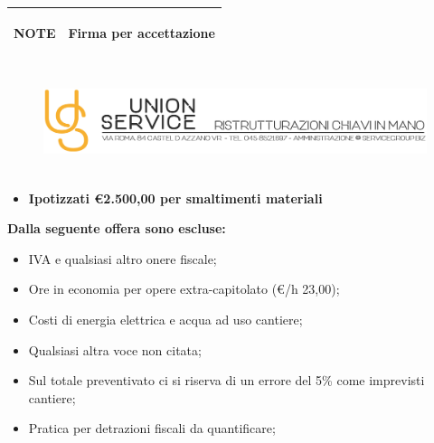 \documentclass[a4paper]{article}
\begin{document}
                       
                      \vspace{19mm}


                      \begin{center}
                      \begin{tabular}{|L{105mm} | L{44mm}| }
                      \hline
                      \begin{spacing}{0.3}
                        \textbf{NOTE} \newline
                        \hfill
                      
                      \end{spacing}&
                      \begin{spacing}{0.3}
                      \textbf{Firma per accettazione}
                      \end{spacing}\\
                      \hline
                      \end{tabular}
                      \end{center}

                      \newpage

                      \begin{figure}[!t]
                      \includegraphics[width=15.8cm, height=3cm]{intestazioneAlta2.jpg}
                      \end{figure}

                      \begin{itemize}
                          \item \textbf{Ipotizzati \euro 2.500,00 per smaltimenti materiali}
                      \end{itemize}

                      \noindent\textbf{Dalla seguente offera sono escluse:}
                      \begin{itemize}
                          \item IVA e qualsiasi altro onere fiscale;
                          \item Ore in economia per opere extra-capitolato (\euro/h 23,00);
                          \item Costi di energia elettrica e acqua ad uso cantiere;
                          \item Qualsiasi altra voce non citata;
                          \item Sul totale preventivato ci si riserva di un errore del 5\% come imprevisti cantiere;
                          \item Pratica per detrazioni fiscali da quantificare;
                      \end{itemize}
\end{document}
